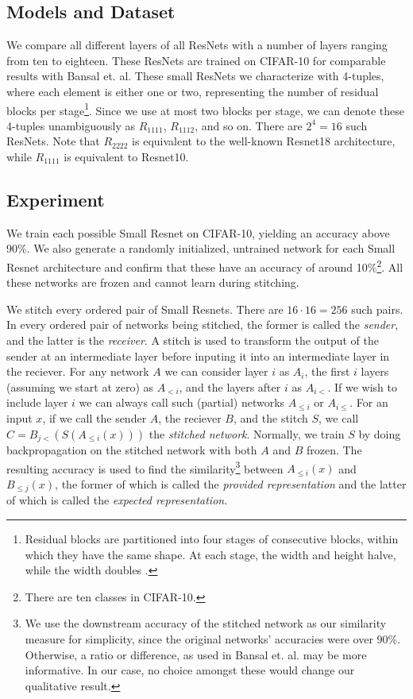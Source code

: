\documentclass{article}
\begin{document}
\subsection{Models and Dataset}
We compare all different
layers of all ResNets with a number of layers ranging from ten to eighteen.
These ResNets are trained on CIFAR-10 for comparable results
with Bansal et. al. These small ResNets we characterize with 4-tuples, where 
each element is either one or two, representing the number of residual blocks per stage\footnote{
   Residual blocks are partitioned into four stages of consecutive blocks, within which they have the same shape. At each stage, the
   width and height halve, while the width doubles \cite{He2016DeepRL}.
}. Since we use at most two blocks per stage, we can denote these 4-tuples unambiguously as
$R_{1111}$, $R_{1112}$, and so on. There are $2^4 = 16$ such ResNets. Note that $R_{2222}$ is equivalent
to the well-known Resnet18 architecture, while $R_{1111}$ is equivalent to Resnet10.

\subsection{Experiment}
We train each possible Small Resnet on CIFAR-10, yielding an accuracy above 90\%. We also
generate a randomly initialized, untrained network for each Small Resnet architecture and confirm
that these have an accuracy of around 10\%\footnote{There are ten classes in CIFAR-10.}. All these
networks are frozen and cannot learn during stitching.

We stitch every ordered pair of Small Resnets. There are $16 \cdot 16 = 256$ such pairs.
In every ordered pair of networks being stitched, the former is called the \textit{sender}, and the latter
is the \textit{receiver}. A stitch is used to transform the output of the sender at an intermediate layer
before inputing it into an intermediate layer in the reciever. For any network $A$ we can consider 
layer $i$ as $A_i$, the first $i$  layers (assuming we start at zero) as $A_{<i}$, and the layers 
after $i$ as $A_{i<}$. If we wish to include layer $i$ we can always call such (partial) networks
$A_{\leq i}$ or $A_{i\leq}$. For an input $x$, if we call the sender $A$, the reciever $B$,
and the stitch $S$, we call $C = B_{j<}(S(A_{\leq i}(x)))$ the \textit{stitched network}. Normally,
we train $S$ by doing backpropagation on the stitched network with both $A$ and $B$ frozen. The
resulting accuracy is used to find the similarity\footnote{
  We use the downstream accuracy of the stitched network as our similarity measure for simplicity,
  since the original networks' accuracies were over 90\%. Otherwise, a ratio or difference, as used
  in Bansal et. al. may be more informative. In our case, no choice amongst these would change
  our qualitative result.
} between $A_{\leq i}(x)$ and $B_{\leq j}(x)$, the
former of which is called the \textit{provided representation} and the latter of which is called
the \textit{expected representation}.
\end{document}
